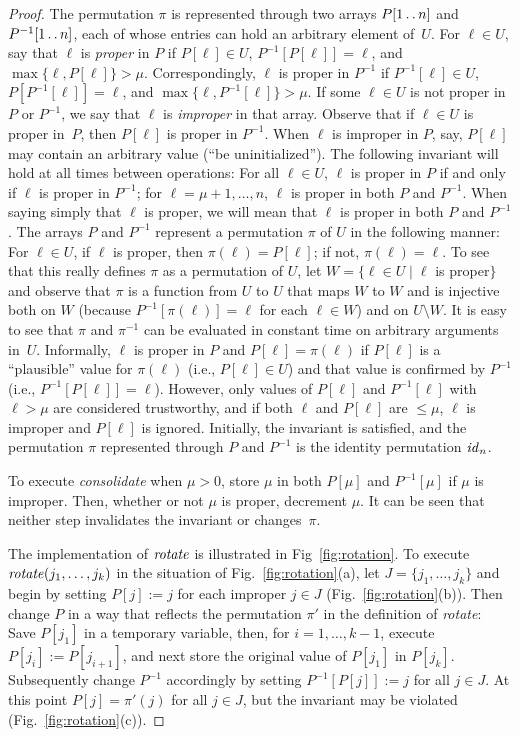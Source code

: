 \documentclass[envcountsame,envcountsect,undated,nolinenumbers]{lnthi}
\def\Tvn#1{\hbox{\textit{#1\/}}}
\def\Ttwodots{\mathinner{\ldotp\ldotp}}\def\Tsup#1{^{\mbox{\scriptsize #1}}}\gdef\Tsub#1{_{\mbox{\scriptsize #1}}}\def\cchoice{\overline{\Tvn{choice}}}
\begin{document}
\begin{proof}
The permutation $\pi$ is represented through two
arrays $P[1\Ttwodots n]$ and $P^{-1}[1\Ttwodots n]$,
each of whose entries can hold an arbitrary element of~$U$.
For $\ell\in U$, say that $\ell$ is \emph{proper}
in $P$ if $P[\ell]\in U$, $P^{-1}[P[\ell]]=\ell$, and
$\max\{\ell,P[\ell]\}>\mu$.
Correspondingly, $\ell$ is proper in $P^{-1}$
if $P^{-1}[\ell]\in U$, $P[P^{-1}[\ell]]=\ell$, and
$\max\{\ell,P^{-1}[\ell]\}>\mu$.
If some $\ell\in U$ is not proper in $P$ or $P^{-1}$,
we say that $\ell$ is \emph{improper} in that array.
Observe that if $\ell\in U$ is proper in~$P$,
then $P[\ell]$ is proper in $P^{-1}$.
When $\ell$ is improper in $P$, say, $P[\ell]$
may contain an arbitrary value
(``be uninitialized'').
The following invariant will hold at all times
between operations:
For all $\ell\in U$, $\ell$ is proper in $P$
if and only if $\ell$ is proper in $P^{-1}$;
for $\ell=\mu+1,\ldots,n$, $\ell$ is proper in both $P$ and $P^{-1}$.
When saying simply that $\ell$ is proper,
we will mean that $\ell$ is proper in both $P$ and $P^{-1}$.
The arrays $P$ and $P^{-1}$ represent a
permutation $\pi$ of $U$ in the following manner:
For $\ell\in U$, if $\ell$ is proper,
then $\pi(\ell)=P[\ell]$; if not, $\pi(\ell)=\ell$.
To see that this really defines $\pi$ as a
permutation of $U$, let $W=\{\ell\in U\mid \ell$ is proper$\}$
and observe that $\pi$ is a function from $U$ to $U$ that
maps $W$ to $W$ and is injective both on $W$
(because $P^{-1}[\pi(\ell)]=\ell$ for each $\ell\in W$)
and on $U\setminus W$.
It is easy to see that
$\pi$ and $\pi^{-1}$ can be evaluated in
constant time on arbitrary arguments in~$U$.
Informally, $\ell$ is proper in $P$
and $P[\ell]=\pi(\ell)$ if $P[\ell]$ is a ``plausible''
value for $\pi(\ell)$ (i.e., $P[\ell]\in U$)
and that value is confirmed by $P^{-1}$
(i.e., $P^{-1}[P[\ell]]=\ell$).
However, only values of $P[\ell]$ and $P^{-1}[\ell]$
with $\ell>\mu$ are considered trustworthy,
and if both $\ell$ and $P[\ell]$ are $\le \mu$,
$\ell$ is improper and $P[\ell]$ is ignored.
Initially, the invariant is
satisfied, and the permutation $\pi$
represented through $P$ and $P^{-1}$ is
the identity permutation $\Tvn{id}_n$.

To execute \Tvn{consolidate} when $\mu>0$,
store $\mu$ in both $P[\mu]$ and $P^{-1}[\mu]$
if $\mu$ is improper.
Then, whether or not $\mu$ is proper, decrement $\mu$.
It can be seen that neither step
invalidates the invariant or changes~$\pi$.

The implementation of
$\Tvn{rotate}$ is illustrated in
Fig~\ref{fig:rotation}.
To execute $\Tvn{rotate}(j_1,\ldots,j_k)$
in the situation of
Fig.~\ref{fig:rotation}(a),
let $J=\{j_1,\ldots,j_k\}$ and begin by
setting $P[j]:=j$ for each improper $j\in J$
(Fig.~\ref{fig:rotation}(b)).
Then change $P$ in a way that
reflects the permutation $\pi'$ in the
definition of \Tvn{rotate}:
Save $P[j_1]$ in a temporary variable,
then, for $i=1,\ldots,k-1$,
execute $P[j_i]:=P[j_{i+1}]$, and
next store the original value of $P[j_1]$ in $P[j_k]$.
Subsequently change $P^{-1}$ accordingly
by setting $P^{-1}[P[j]]:=j$ for all $j\in J$.
At this point $P[j]=\pi'(j)$ for all $j\in J$,
but the invariant may be violated
(Fig.~\ref{fig:rotation}(c)).


\end{proof}
\end{document}

